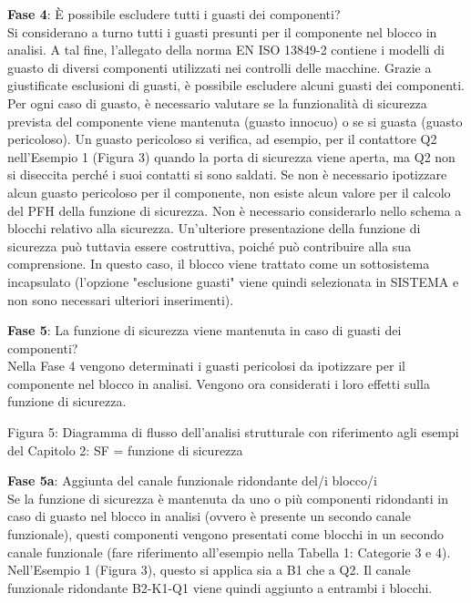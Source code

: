 \documentclass[a4paper,11pt]{article}
\begin{document}
    \par\medskip\noindent \textbf{Fase 4}: È possibile escludere tutti i guasti dei componenti?\\
    Si considerano a turno tutti i guasti presunti per il componente nel blocco in analisi. A tal fine, l'allegato della norma EN ISO 13849-2 contiene i modelli di guasto di diversi componenti utilizzati nei controlli delle macchine. Grazie a giustificate esclusioni di guasti, è possibile escludere alcuni guasti dei componenti. Per ogni caso di guasto, è necessario valutare se la funzionalità di sicurezza prevista del componente viene mantenuta (guasto innocuo) o se si guasta (guasto pericoloso). Un guasto pericoloso si verifica, ad esempio, per il contattore Q2 nell'Esempio 1 (Figura 3) quando la porta di sicurezza viene aperta, ma Q2 non si diseccita perché i suoi contatti si sono saldati. Se non è necessario ipotizzare alcun guasto pericoloso per il componente, non esiste alcun valore per il calcolo del PFH della funzione di sicurezza. Non è necessario considerarlo nello schema a blocchi relativo alla sicurezza. Un'ulteriore presentazione della funzione di sicurezza può tuttavia essere costruttiva, poiché può contribuire alla sua comprensione. In questo caso, il blocco viene trattato come un sottosistema incapsulato (l'opzione "esclusione guasti" viene quindi selezionata in SISTEMA e non sono necessari ulteriori inserimenti).
    
    \par\medskip\noindent \textbf{Fase 5}: La funzione di sicurezza viene mantenuta in caso di guasti dei componenti?\\
    Nella Fase 4 vengono determinati i guasti pericolosi da ipotizzare per il componente nel blocco in analisi. Vengono ora considerati i loro effetti sulla funzione di sicurezza.

    Figura 5: Diagramma di flusso dell'analisi strutturale con riferimento agli esempi del Capitolo 2: SF = funzione di sicurezza

    \par\medskip\noindent \textbf{Fase 5a}: Aggiunta del canale funzionale ridondante del/i blocco/i\\
    Se la funzione di sicurezza è mantenuta da uno o più componenti ridondanti in caso di guasto nel blocco in analisi (ovvero è presente un secondo canale funzionale), questi componenti vengono presentati come blocchi in un secondo canale funzionale (fare riferimento all'esempio nella Tabella 1: Categorie 3 e 4).
    Nell'Esempio 1 (Figura 3), questo si applica sia a B1 che a Q2. Il canale funzionale ridondante B2-K1-Q1 viene quindi aggiunto a entrambi i blocchi.
    
\end{document}
